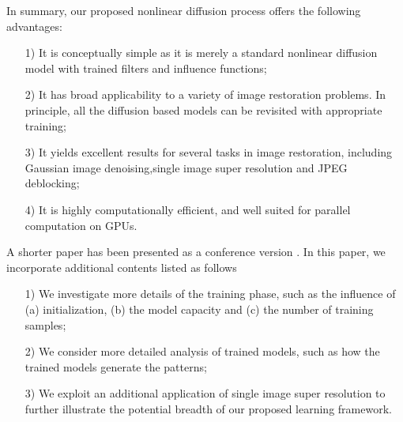 \documentclass[10pt,journal,compsoc]{IEEEtran}
\begin{document}
In summary, 
our proposed nonlinear diffusion process offers the following advantages: 
\begin{itemize}
\setlength\itemsep{0em}
    \item[1)] It is conceptually simple as it is merely a standard nonlinear diffusion model with trained filters and influence functions; 
    \item[2)] It has broad applicability to a variety of image restoration problems. 
In principle, all the diffusion based models can be revisited with appropriate training;
    \item[3)] It yields excellent results for several tasks in image restoration, 
including Gaussian image denoising,single image super resolution and JPEG deblocking;
    \item[4)] It is highly computationally efficient, and well suited for parallel computation on GPUs.
\end{itemize}

A shorter paper has been presented as a conference version 
\cite{ChenPock15}. In this paper, 
we incorporate additional contents listed as follows 
\begin{itemize}
\setlength\itemsep{0em}
    \item[1)] We investigate more details of the training phase, such as the influence of (a) initialization, (b) the model capacity and (c) the number of training samples; 
    \item[2)] We consider more detailed analysis of trained models, such as how the trained models generate the patterns;
    \item[3)] We exploit an additional application of single image super resolution 
to further illustrate the potential breadth of our 
proposed learning framework. 
\end{itemize}
\end{document}
